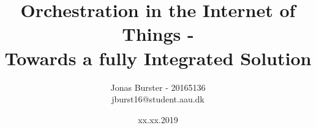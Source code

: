 \pagestyle{fancy}
\fancyhf{}
\title{Orchestration in the Internet of Things -\\ Towards a fully Integrated Solution}
\author{Jonas Burster - 20165136\\jburst16@student.aau.dk}

\date{xx.xx.2019}
\pagestyle{fancy}
\makeatletter
\let\runtitle\@title
\let\runauthor\@author
\makeatother
\lhead{\runtitle}

